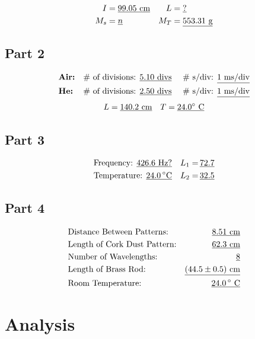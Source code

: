 \documentclass[twocolumn,english]{IEEEtran}
\theoremstyle{plain}
\theoremstyle{plain}
\begin{document}
  \begin{align*}
   I   &= \text{\underline{$99.05$ cm}}	&	L&= \text{\underline{$?$}} \\
   M_s &= \text{\underline{$n$}} 	&	M_T&= \text{\underline{$553.31$ g}}
  \end{align*}

  \subsection*{\textbf{Part 2}}
  \begin{align*}
   &\text{\textbf{Air:}}	&\text{\# of divisions: } &\text{\underline{$5.10$ divs} }	& &\text{\# s/div: \underline{$1$ ms/div}} \\
   &\text{\textbf{He:}}		&\text{\# of divisions: } &\text{\underline{$2.50$ divs} }		& &\text{\# s/div: \underline{$1$ ms/div}}
  \end{align*}
  \begin{align*}
   &L = \text{\underline{$140.2$ cm}}	&T = \text{\underline{$24.0^{\circ}$ C}}
  \end{align*}


  \subsection*{\textbf{Part 3}}
  \begin{align*}
   &\text{Frequency: \underline{$426.6$ Hz?}} 			&\text{$L_1 =\,$\underline{$72.7$}} \\
   &\text{Temperature: \underline{$24.0\,^{\circ}$C}}		&\text{$L_2 =\,$\underline{$32.5$}}
  \end{align*}

  \subsection*{\textbf{Part 4}}
  \begin{align*}
   &\text{Distance Between Patterns:} 	&\text{\underline{$8.51$ cm}} \\
   &\text{Length of Cork Dust Pattern:} &\text{\underline{$62.3$ cm}} \\
   &\text{Number of Wavelengths:} 	&\text{\underline{$8$}} \\
   &\text{Length of Brass Rod:} 	&\text{\underline{$(44.5\pm0.5)$ cm}} \\
   &\text{Room Temperature:} 		&\text{\underline{$24.0\,^{\circ}$ C}}
  \end{align*}

\section{Analysis}
\end{document}
